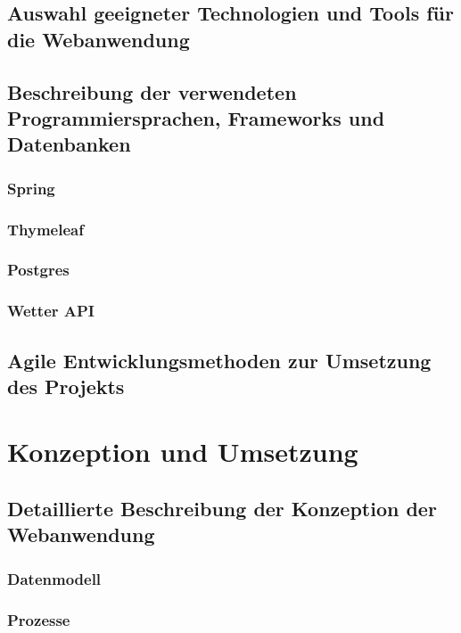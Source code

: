 \documentclass[fontsize=12pt,openright,oneside,paper=a4,BCOR=1cm]{scrbook}
\begin{document}
\section{Auswahl geeigneter Technologien und Tools für die Webanwendung}

\section{Beschreibung der verwendeten Programmiersprachen, Frameworks und Datenbanken}

\subsection{Spring}

\subsection{Thymeleaf}

\subsection{Postgres}

\subsection{Wetter API}

\section{Agile Entwicklungsmethoden zur Umsetzung des Projekts}


%
%

\renewcommand{\cleardoublepage}{}
\chapter{Konzeption und Umsetzung}

\section{Detaillierte Beschreibung der Konzeption der Webanwendung}

\subsection{Datenmodell}
\subsection{Prozesse}
\end{document}
